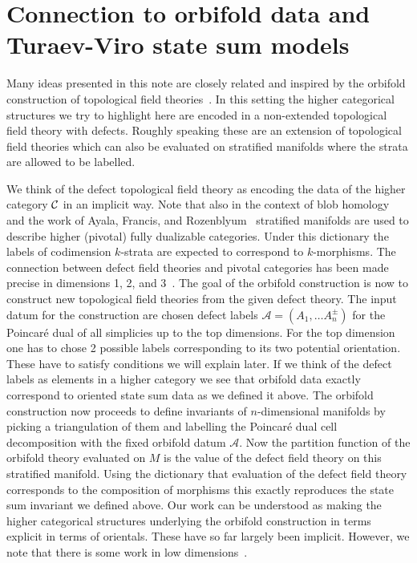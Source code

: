 \section{Connection to orbifold data and Turaev-Viro state sum models}
Many ideas presented in this note are closely related and inspired by the orbifold construction of topological field theories~\cite{carqueville2019orbifolds}. In this setting the higher categorical structures we try to highlight here are encoded in a non-extended topological field theory with defects. Roughly speaking these are an extension of topological field theories which can also be evaluated on stratified manifolds where the strata are allowed to be labelled.

We think of the defect topological field theory as encoding the data of the higher category $\mathcal{C}$ in an implicit way. Note that also in the context of blob homology~\cite{blob} and the work of Ayala, Francis, and Rozenblyum~\cite{Ayala2015ASH} stratified manifolds are used to describe higher (pivotal) fully dualizable categories.
Under this dictionary the labels of codimension $k$-strata are expected to correspond to $k$-morphisms.
The connection between defect field theories and pivotal categories has been made precise in dimensions 1, 2, and 3~\cite{Davydov:2011kb,CARQUEVILLE2020107024}.
The goal of the orbifold construction is now to construct new topological field theories from the given defect theory.
The input datum for the construction are chosen defect labels $\mathcal{A}=(A_1,\dots A_n^{\pm})$ for the Poincaré dual of all simplicies up to the top dimensions.
For the top dimension one has to chose 2 possible labels corresponding to its two potential orientation.
These have to satisfy conditions we will explain later.
If we think of the defect labels as elements in a higher category we see that orbifold data exactly correspond to oriented state sum data as we defined it above.
The orbifold construction now proceeds to define invariants of $n$-dimensional manifolds by picking a triangulation of them and labelling the Poincaré dual cell decomposition with the fixed orbifold datum $\mathcal{A}$.
Now the partition function of the orbifold theory evaluated on $M$ is the value of the defect field theory on this stratified manifold.
Using the dictionary that evaluation of the defect field theory corresponds to the composition of morphisms this exactly reproduces the state sum invariant we defined above.
Our work can be understood as making the higher categorical structures underlying the orbifold construction in terms explicit in terms of orientals.
These have so far largely been implicit.
However, we note that there is some work in low dimensions~\cite{carqueville2016orbifoldcompletion,3DOrb}.

